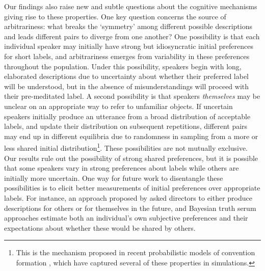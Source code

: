 \documentclass[alpha-refs]{wiley-article}
\begin{document}
Our findings also raise new and subtle questions about the cognitive mechanisms giving rise to these properties.
One key question concerns the source of arbitrariness: what breaks the `symmetry' among different possible descriptions and leads different pairs to diverge from one another?
One possibility is that each individual speaker may initially have strong but idiosyncratic initial preferences for short labels, and arbitrariness emerges from variability in these preferences throughout the population.
Under this possibility, speakers begin with long, elaborated descriptions due to uncertainty about whether their preferred label will be understood, but in the absence of misunderstandings will proceed with their pre-meditated label.
A second possibility is that speakers \emph{themselves} may be unclear on an appropriate way to refer to unfamiliar objects.
If uncertain speakers initially produce an utterance from a broad distribution of acceptable labels, and update their distribution on subsequent repetitions, different pairs may end up in different equilibria due to randomness in sampling from a more or less shared initial distribution\footnote{This is the mechanism proposed in recent probabilistic models of convention formation \citep{smith_learning_2013,hawkins_convention-formation_2017,Brochagen17}, which have captured several of these properties in simulations.}. 
These possibilities are not mutually exclusive.
Our results rule out the possibility of strong shared preferences, but it is possible that some speakers vary in strong preferences about labels while others are initially more uncertain. 
One way for future work to disentangle these possibilities is to elicit better measurements of initial preferences over appropriate labels.
For instance, an approach proposed by \cite{FussellKrauss89_IntendedAudienceCommonGround} asked directors to either produce descriptions for others or for themselves in the future, and Bayesian truth serum approaches \citep{prelec2004bayesian} estimate both an individual's own subjective preferences and their expectations about whether these would be shared by others.
\end{document}
